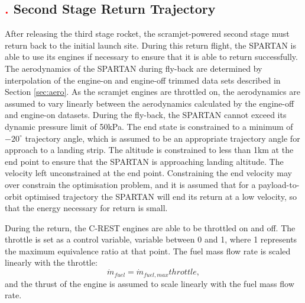 \subsection{\textcolor{red}{.} Second Stage Return Trajectory}
After releasing the third stage rocket, the scramjet-powered second stage must return back to the initial launch site. During this return flight, the SPARTAN is able to use its engines if necessary to ensure that it is able to return successfully. The aerodynamics of the SPARTAN during fly-back are determined by interpolation of the engine-on and engine-off trimmed data sets described in Section \ref{sec:aero}. As the scramjet engines are throttled on, the aerodynamics are assumed to vary linearly between the aerodynamics calculated by the engine-off and engine-on datasets. 
During the fly-back, the SPARTAN cannot exceed its dynamic pressure limit of 50kPa. 
 The end state is constrained to a minimum of $-20^\circ$ trajectory angle, which is assumed to be an appropriate trajectory angle for approach to a landing strip. The altitude is constrained to less than 1km at the end point to ensure that the SPARTAN is approaching landing altitude.
 The velocity left unconstrained at the end point. Constraining the end velocity may over constrain the optimisation problem, and it is assumed that for a payload-to-orbit optimised trajectory the SPARTAN will end its return at a low velocity, so that the energy necessary for return is small. 
 
During the return, the C-REST engines are able to be throttled on and off. The throttle is set as a control variable, variable between 0 and 1, where 1 represents the maximum equivalence ratio at that point. The fuel mass flow rate is scaled linearly with the throttle:  
\begin{equation}
\dot{m}_{fuel} = \dot{m}_{fuel,max}throttle,
\end{equation}
and the thrust of the engine is assumed to scale linearly with the fuel mass flow rate. 


